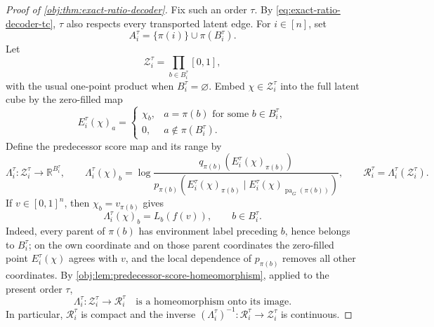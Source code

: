 \documentclass[11pt]{article}
\begin{document}
\begin{proof}[Proof of \cref{obj:thm:exact-ratio-decoder}]
Fix such an order \(\tau\). By \cref{eq:exact-ratio-decoder-tc}, \(\tau\) also respects every transported latent edge. For \(i\in[n]\), set
\[
A_i^\tau=\{\pi(i)\}\cup\pi(B_i^\tau).
\]
Let
\[
\mathcal Z_i^\tau=\prod_{b\in B_i^\tau}[0,1],
\]
with the usual one-point product when \(B_i^\tau=\varnothing\). Embed \(\chi\in\mathcal Z_i^\tau\) into the full latent cube by the zero-filled map
\[
E_i^\tau(\chi)_a=
\begin{cases}
\chi_b, & a=\pi(b)\text{ for some }b\in B_i^\tau,\\
0, & a\notin\pi(B_i^\tau).
\end{cases}
\]
Define the predecessor score map and its range by
\[
\Lambda_i^\tau:\mathcal Z_i^\tau\to\mathbb R^{B_i^\tau},
\qquad
\Lambda_i^\tau(\chi)_b
=
\log
\frac{q_{\pi(b)}\!\left(E_i^\tau(\chi)_{\pi(b)}\right)}
{p_{\pi(b)}\!\left(E_i^\tau(\chi)_{\pi(b)}\mid
E_i^\tau(\chi)_{\operatorname{pa}_G(\pi(b))}\right)},
\qquad
\mathcal R_i^\tau=\Lambda_i^\tau(\mathcal Z_i^\tau).
\]
If \(v\in[0,1]^n\), then \(\chi_b=v_{\pi(b)}\) gives
\[
\Lambda_i^\tau(\chi)_b=L_b(f(v)),
\qquad b\in B_i^\tau.
\]
Indeed, every parent of \(\pi(b)\) has environment label preceding \(b\), hence belongs to \(B_i^\tau\); on the own coordinate and on those parent coordinates the zero-filled point \(E_i^\tau(\chi)\) agrees with \(v\), and the local dependence of \(p_{\pi(b)}\) removes all other coordinates. By \cref{obj:lem:predecessor-score-homeomorphism}, applied to the present order \(\tau\),
\begin{equation}
\Lambda_i^\tau:\mathcal Z_i^\tau\longrightarrow\mathcal R_i^\tau
\quad\text{is a homeomorphism onto its image.}
\label{eq:exact-ratio-decoder-predecessor-homeomorphism}
\end{equation}
In particular, \(\mathcal R_i^\tau\) is compact and the inverse \((\Lambda_i^\tau)^{-1}:\mathcal R_i^\tau\to\mathcal Z_i^\tau\) is continuous. %


\end{proof}
\end{document}
